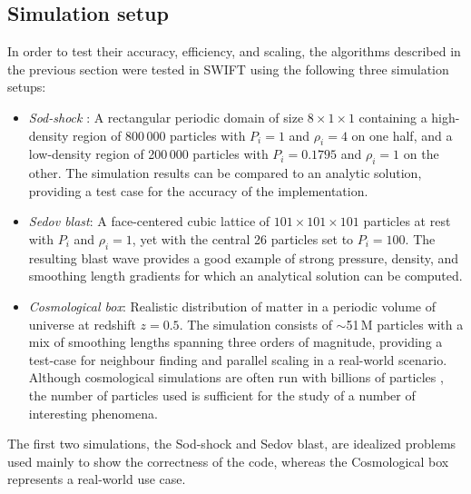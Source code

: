 \documentclass[final]{siamltex}
\begin{document}
\subsection{Simulation setup}

In order to test their accuracy, efficiency, and scaling,
the algorithms described in the previous section
were tested in SWIFT using the following three
simulation setups:
%
\begin{itemize}
    \item {\em Sod-shock} \cite{ref:Sod1978}: A rectangular periodic
        domain of size $8\times 1 \times 1$ containing a
        high-density region of
        800\,000 particles with $P_i=1$ and $\rho_i=4$ on one half,
        and a low-density region of 200\,000
        particles with $P_i=0.1795$ and $\rho_i=1$ on the other.
        The simulation results can be compared to an analytic
        solution, providing a test case for the accuracy of the
        implementation.
    \item {\em Sedov blast}: A face-centered cubic lattice of
        $101\times 101\times 101$
        particles at rest with $P_i$ and $\rho_i=1$, yet with the
        central 26 particles set to
        $P_i=100$.
        The resulting blast wave provides a good example of
        strong pressure, density, and smoothing length gradients
        for which an analytical solution can be computed.
    \item {\em Cosmological box}: Realistic distribution of matter
        in a periodic volume of universe at redshift $z=0.5$.
        The simulation consists
        of $\sim$51\,M particles with
        a mix of smoothing lengths spanning three orders of magnitude,
        providing a test-case for neighbour finding and parallel
        scaling in a real-world scenario.
        Although cosmological simulations are often run with
        billions of particles \cite{ref:Springel2005b}, the number of
        particles used is sufficient for the study of a number of
        interesting phenomena.
\end{itemize}
%
The first two simulations, the Sod-shock and Sedov blast,
are idealized problems used mainly to show
the correctness of the code, whereas the Cosmological box represents
a real-world use case.
\end{document}
